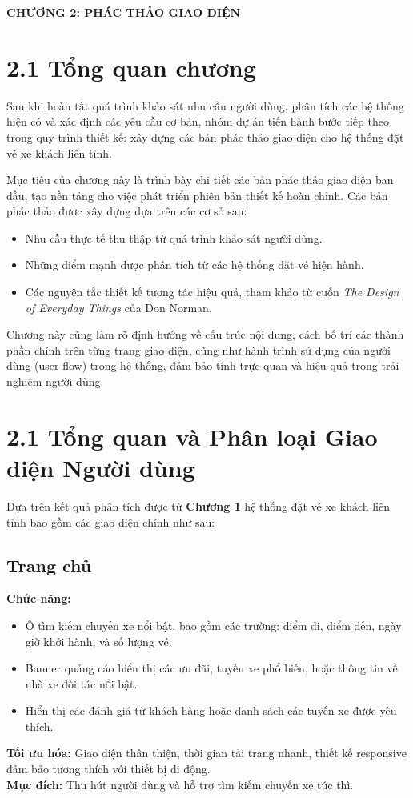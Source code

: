 \newpage
\begin{center}
    {\large\textbf{CHƯƠNG 2: PHÁC THẢO GIAO DIỆN}}\\
\end{center}

\section*{2.1 Tổng quan chương}
Sau khi hoàn tất quá trình khảo sát nhu cầu người dùng, phân tích các hệ thống hiện có và xác định các yêu cầu cơ bản, nhóm dự án tiến hành bước tiếp theo trong quy trình thiết kế: xây dựng các bản phác thảo giao diện cho hệ thống đặt vé xe khách liên tỉnh.

Mục tiêu của chương này là trình bày chi tiết các bản phác thảo giao diện ban đầu, tạo nền tảng cho việc phát triển phiên bản thiết kế hoàn chỉnh. Các bản phác thảo được xây dựng dựa trên các cơ sở sau:
\begin{itemize}
    \item Nhu cầu thực tế thu thập từ quá trình khảo sát người dùng.
    \item Những điểm mạnh được phân tích từ các hệ thống đặt vé hiện hành.
    \item Các nguyên tắc thiết kế tương tác hiệu quả, tham khảo từ cuốn \textit{The Design of Everyday Things} của Don Norman.
\end{itemize}

Chương này cũng làm rõ định hướng về cấu trúc nội dung, cách bố trí các thành phần chính trên từng trang giao diện, cũng như hành trình sử dụng của người dùng (user flow) trong hệ thống, đảm bảo tính trực quan và hiệu quả trong trải nghiệm người dùng.

\section*{2.1 Tổng quan và Phân loại Giao diện Người dùng}
Dựa trên kết quả phân tích được từ \textbf{Chương 1} hệ thống đặt vé xe khách liên tỉnh bao gồm các giao diện chính như sau:
\subsection*{Trang chủ}
\textbf{Chức năng:}
\begin{itemize}
    \item Ô tìm kiếm chuyến xe nổi bật, bao gồm các trường: điểm đi, điểm đến, ngày giờ khởi hành, và số lượng vé.
    \item Banner quảng cáo hiển thị các ưu đãi, tuyến xe phổ biến, hoặc thông tin về nhà xe đối tác nổi bật.
    \item Hiển thị các đánh giá từ khách hàng hoặc danh sách các tuyến xe được yêu thích.
\end{itemize}
\textbf{Tối ưu hóa:} Giao diện thân thiện, thời gian tải trang nhanh, thiết kế responsive đảm bảo tương thích với thiết bị di động.\\
\textbf{Mục đích:} Thu hút người dùng và hỗ trợ tìm kiếm chuyến xe tức thì.

